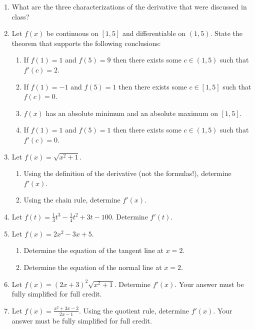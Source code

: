 \documentclass[letterpaper,12pt,fleqn]{article}
\begin{document}
\begin{enumerate}[left=0pt,itemsep=0.5in]

\item What are the three characterizations of the derivative that were discussed in class?

\item Let \(f(x)\) be continuous on \([1,5]\) and differentiable on \((1,5)\).  State the theorem that supports
  the following conclusions:
  \begin{enumerate}
  \item If \(f(1)=1\) and \(f(5)=9\) then there exists some \(c\in(1,5)\) such that \(f'(c)=2\).
  \item If \(f(1)=-1\) and \(f(5)=1\) then there exists some \(c\in[1,5]\) such that \(f(c)=0\).
  \item \(f(x)\) has an absolute minimum and an absolute maximum on \([1,5]\).
  \item If \(f(1)=1\) and \(f(5)=1\) then there exists some \(c\in(1,5)\) such that \(f'(c)=0\).
  \end{enumerate}

\item Let \(f(x)=\sqrt{x^2+1}\).
  \begin{enumerate}
  \item Using the definition of the derivative (not the formulas!), determine \(f'(x)\).
  \item Using the chain rule, determine \(f'(x)\).
  \end{enumerate}

\item Let \(f(t)=\frac{1}{3}t^3-\frac{1}{4}t^2+3t-100\).  Determine \(f'(t)\).

\item Let \(f(x)=2x^2-3x+5\).
  \begin{enumerate}
  \item Determine the equation of the tangent line at \(x=2\).
  \item Determine the equation of the normal line at \(x=2\).
  \end{enumerate}

\item Let \(f(x)=(2x+3)^2\sqrt{x^2+1}\).  Determine \(f'(x)\).  Your answer must be fully simplified for full credit.

\item Let \(\displaystyle f(x)=\frac{x^2+3x-2}{2x-1}\).  Using the quotient rule, determine \(f'(x)\).  Your answer
  must be fully simplified for full credit.


\end{enumerate}
\end{document}
